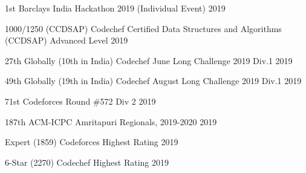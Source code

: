 \begin{cvhonors}

\cvhonor
{1st} %
{Barclays India Hackathon 2019 (Individual Event)} %
{} %
{2019} %


\cvhonor
{1000/1250 (CCDSAP)} %
{Codechef Certified Data Structures and Algorithms (CCDSAP) Advanced Level} %
{} %
{2019} %


\cvhonor
{27th Globally (10th in India)} %
{Codechef June Long Challenge 2019 Div.1} %
{} %
{2019} %


\cvhonor
{49th Globally (19th in India)} %
{Codechef August Long Challenge 2019 Div.1} %
{} %
{2019} %


\cvhonor
{71st} %
{Codeforces Round \#572 Div 2} %
{} %
{2019} %


\cvhonor
{187th} %
{ACM-ICPC Amritapuri Regionals, 2019-2020} %
{} %
{2019} %






\cvhonor
{Expert (1859)} %
{Codeforces Highest Rating} %
{} %
{2019} %


\cvhonor
{6-Star (2270)} %
{Codechef Highest Rating} %
{} %
{2019} %



\end{cvhonors}
